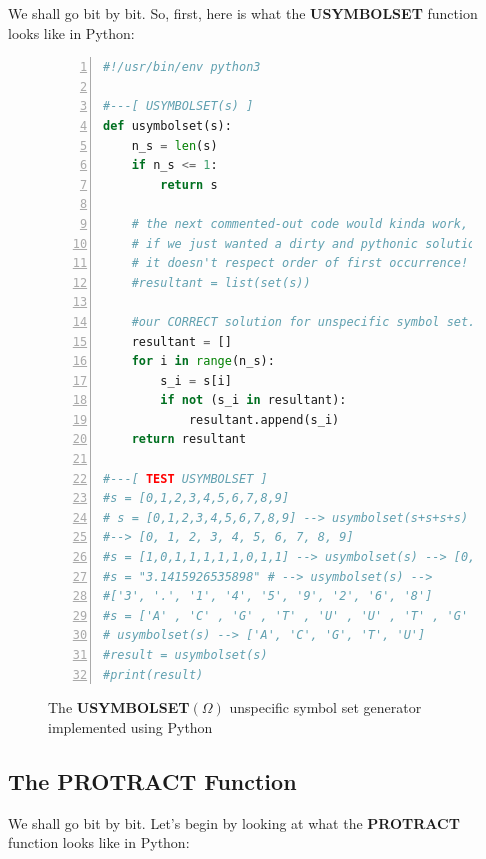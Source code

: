 \documentclass[a4paper, 18pt]{book} %
\begin{document}
We shall go bit by bit. So, first, here is what the \textbf{USYMBOLSET} function looks like in Python:

\begin{figure}[H]
  \begin{center}
  \begin{lstlisting}[caption={The USYMBOLSET}, label={LST_USYMBOLSET}, language=Python, frame=single, numbers=left, basicstyle=\ttfamily,  commentstyle=\color{blue}]
#!/usr/bin/env python3

#---[ USYMBOLSET(s) ]
def usymbolset(s):
    n_s = len(s)
    if n_s <= 1:
        return s

    # the next commented-out code would kinda work,
    # if we just wanted a dirty and pythonic solution, but 
    # it doesn't respect order of first occurrence!
    #resultant = list(set(s))
 
    #our CORRECT solution for unspecific symbol set.. 
    resultant = []
    for i in range(n_s):
        s_i = s[i]
        if not (s_i in resultant):
            resultant.append(s_i)
    return resultant

#---[ TEST USYMBOLSET ]
#s = [0,1,2,3,4,5,6,7,8,9]
# s = [0,1,2,3,4,5,6,7,8,9] --> usymbolset(s+s+s+s) 
#--> [0, 1, 2, 3, 4, 5, 6, 7, 8, 9]
#s = [1,0,1,1,1,1,1,0,1,1] --> usymbolset(s) --> [0,1]
#s = "3.1415926535898" # --> usymbolset(s) --> 
#['3', '.', '1', '4', '5', '9', '2', '6', '8']
#s = ['A' , 'C' , 'G' , 'T' , 'U' , 'U' , 'T' , 'G' , 'C' , 'A'] #w/duplication
# usymbolset(s) --> ['A', 'C', 'G', 'T', 'U']
#result = usymbolset(s)
#print(result)
\end{lstlisting}
  \end{center}
  \caption{The \textbf{USYMBOLSET}$(\Omega)$ unspecific symbol set generator implemented using Python}
\end{figure}


\subsection{The PROTRACT Function}

We shall go bit by bit. Let's begin by looking at what the \textbf{PROTRACT} function looks like in Python:
\end{document}

